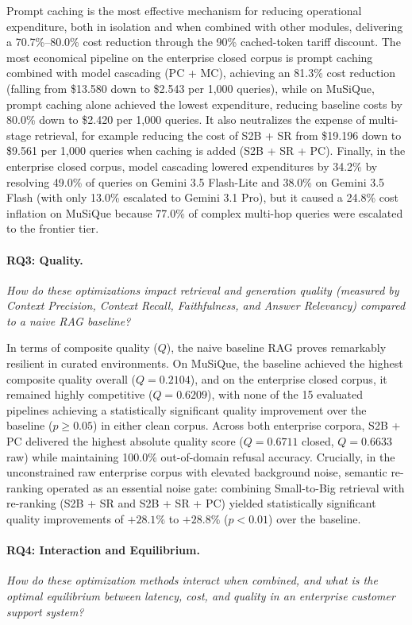Prompt caching is the most effective mechanism for reducing operational expenditure, both in isolation and when combined with other modules, delivering a 70.7\%--80.0\% cost reduction through the 90\% cached-token tariff discount. The most economical pipeline on the enterprise closed corpus is prompt caching combined with model cascading (PC + MC), achieving an 81.3\% cost reduction (falling from \$13.580 down to \$2.543 per 1,000 queries), while on MuSiQue, prompt caching alone achieved the lowest expenditure, reducing baseline costs by 80.0\% down to \$2.420 per 1,000 queries. It also neutralizes the expense of multi-stage retrieval, for example reducing the cost of S2B + SR from \$19.196 down to \$9.561 per 1,000 queries when caching is added (S2B + SR + PC). Finally, in the enterprise closed corpus, model cascading lowered expenditures by 34.2\% by resolving 49.0\% of queries on Gemini 3.5 Flash-Lite and 38.0\% on Gemini 3.5 Flash (with only 13.0\% escalated to Gemini 3.1 Pro), but it caused a 24.8\% cost inflation on MuSiQue because 77.0\% of complex multi-hop queries were escalated to the frontier tier.

\paragraph{RQ3: Quality.} \textit{How do these optimizations impact retrieval and generation quality (measured by Context Precision, Context Recall, Faithfulness, and Answer Relevancy) compared to a naive RAG baseline?}

In terms of composite quality ($Q$), the naive baseline RAG proves remarkably resilient in curated environments. On MuSiQue, the baseline achieved the highest composite quality overall ($Q = 0.2104$), and on the enterprise closed corpus, it remained highly competitive ($Q = 0.6209$), with none of the 15 evaluated pipelines achieving a statistically significant quality improvement over the baseline ($p \ge 0.05$) in either clean corpus. Across both enterprise corpora, S2B + PC delivered the highest absolute quality score ($Q = 0.6711$ closed, $Q = 0.6633$ raw) while maintaining 100.0\% out-of-domain refusal accuracy. Crucially, in the unconstrained raw enterprise corpus with elevated background noise, semantic re-ranking operated as an essential noise gate: combining Small-to-Big retrieval with re-ranking (S2B + SR and S2B + SR + PC) yielded statistically significant quality improvements of $+28.1\%$ to $+28.8\%$ ($p < 0.01$) over the baseline. 

\paragraph{RQ4: Interaction and Equilibrium.} \textit{How do these optimization methods interact when combined, and what is the optimal equilibrium between latency, cost, and quality in an enterprise customer support system?}

